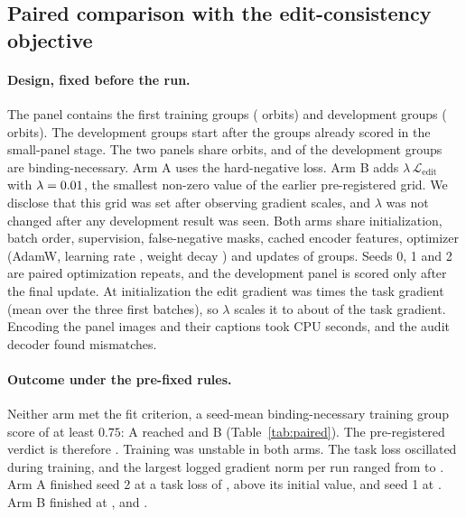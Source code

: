\subsection{Paired comparison with the edit-consistency objective}
\label{sec:paired}

\paragraph{Design, fixed before the run.}
The panel contains the first \SSpanelTrainN{} training groups (\SSpanelTrainOrbits{} orbits) and
\SSpanelDevN{} development groups (\SSpanelDevOrbits{} orbits). The development groups start after
the \SSpanelDevExcluded{} groups already scored in the small-panel stage. The two panels share
\SSpanelOverlap{} orbits, and \PRdevBNN{} of the development groups are binding-necessary. Arm A
uses the hard-negative loss. Arm B adds $\lambda\,\mathcal{L}_{\mathrm{edit}}$ with
$\lambda=0.01$, the smallest non-zero value of the earlier pre-registered grid. We disclose
that this grid was set after observing gradient scales, and $\lambda$ was not changed after any
development result was seen. Both arms share initialization, batch order, supervision,
false-negative masks, cached encoder features, optimizer (AdamW, learning rate \PRlr, weight decay
\PRwd) and \PRsteps{} updates of \PRbatch{} groups. Seeds 0, 1 and 2 are paired optimization
repeats, and the development panel is scored only after the final update. At initialization the
edit gradient was \PRgradInitMean{} times the task gradient (mean over the three first batches), so
$\lambda$ scales it to about \PRgradInitLamMean{} of the task gradient. Encoding the
\PRrenderImages{} panel images and their captions took \PRencCPU{} CPU seconds, and the audit
decoder found \PRrenderMismatch{} mismatches.

\begin{table}[t]
\caption{Paired comparison on \SSpanelTrainN{} training and \SSpanelDevN{} development groups
(\PRdevBNN{} binding-necessary). Seeds 0/1/2 are paired optimization repeats on the same panel.
Chance for independent scores: group $1/6$, GroupMatch $1/2$, pair AUC $0.5$. Source:
\url{runs/paired_v1_20260926T230018Z/paired_summary.json}.}
\label{tab:paired}
\centering\small

\end{table}

\paragraph{Outcome under the pre-fixed rules.}
Neither arm met the fit criterion, a seed-mean binding-necessary training group score of at least
$0.75$: A reached \PRATrainBNGroupMean{} and B \PRBTrainBNGroupMean{} (Table~\ref{tab:paired}). The
pre-registered verdict is therefore \texttt{\PRverdict}. Training was unstable in both arms. The
task loss oscillated during training, and the largest logged gradient norm per run ranged from
\PRgradMinOfMax{} to \PRgradMaxAll. Arm A finished seed 2 at a task loss of \PRALossLastSeedTwo{},
above its initial value, and seed 1 at \PRALossLastSeedOne. Arm B finished at
\PRBLossLastSeedZero, \PRBLossLastSeedOne{} and \PRBLossLastSeedTwo.

